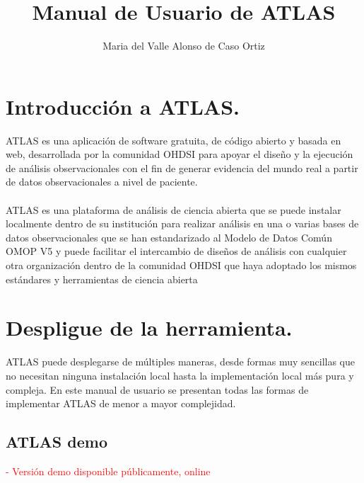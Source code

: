 \documentclass{article}
\title{Manual de Usuario de ATLAS}
\author{Maria del Valle Alonso de Caso Ortiz}
\begin{document}
\maketitle



\section{Introducción a ATLAS.}

ATLAS es una aplicación de software gratuita, de código abierto y basada en web, desarrollada por la comunidad OHDSI para apoyar el diseño y la ejecución de análisis observacionales con el fin de generar evidencia del mundo real a partir de datos observacionales a nivel de paciente. 
\\
\\
ATLAS es una plataforma de análisis de ciencia abierta que se puede instalar localmente dentro de su institución para realizar análisis en una o varias bases de datos observacionales que se han estandarizado al Modelo de Datos Común OMOP V5 y puede facilitar el intercambio de diseños de análisis con cualquier otra organización dentro de la comunidad OHDSI que haya adoptado los mismos estándares y herramientas de ciencia abierta \cite{OHDSIAtlasWiki}



\section{Despligue de la herramienta.}

ATLAS puede desplegarse de múltiples maneras, desde formas muy sencillas que no necesitan ninguna instalación local hasta la implementación local más pura y compleja. En este manual de usuario se presentan todas las formas de implementar ATLAS de menor a mayor complejidad.

\subsection{ATLAS demo}

\textcolor{red}{- Versión demo disponible públicamente, online}
\end{document}
